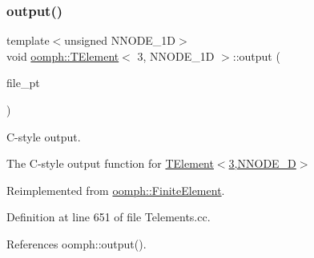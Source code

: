 \mbox{\label{classoomph_1_1TElement_3_013_00_01NNODE__1D_01_4_aed56950c0e732fd82642e02de3ada47b}} 
\subsubsection{\texorpdfstring{output()}{output()}\hspace{0.1cm}{\footnotesize\ttfamily [3/4]}}
{\footnotesize\ttfamily template$<$unsigned N\+N\+O\+D\+E\+\_\+1D$>$ \\
void \hyperlink{classoomph_1_1TElement}{oomph\+::\+T\+Element}$<$ 3, N\+N\+O\+D\+E\+\_\+1D $>$\+::output (\begin{DoxyParamCaption}\item[{F\+I\+LE $\ast$}]{file\+\_\+pt }\end{DoxyParamCaption})\hspace{0.3cm}{\ttfamily [virtual]}}



C-\/style output. 

The C-\/style output function for \hyperlink{classoomph_1_1TElement_3_013_00_01NNODE__1D_01_4}{T\+Element$<$3,\+N\+N\+O\+D\+E\+\_\+D$>$} 

Reimplemented from \hyperlink{classoomph_1_1FiniteElement_a72cddd09f8ddbee1a20a1ff404c6943e}{oomph\+::\+Finite\+Element}.



Definition at line 651 of file Telements.\+cc.



References oomph\+::output().

\mbox{\label{classoomph_1_1TElement_3_013_00_01NNODE__1D_01_4_a4f18cb8f2a3a26dc086a84b7752870da}} 
